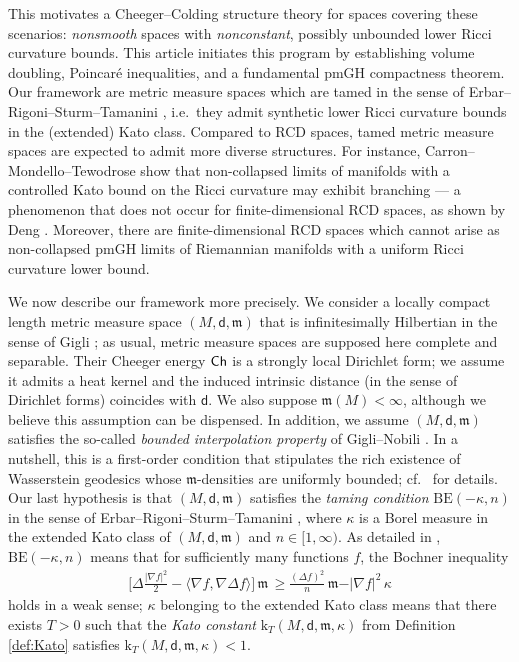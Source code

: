 \documentclass[10pt]{article}
\newcommand{\m}{\mathfrak{m}}
\newcommand{\M}{{\mathit{M}}}
\renewcommand{\k}{\mathrm{k}}
\newcommand{\dist}{\mathsf{d}}
\newcommand{\Ch}{{\sf Ch}}
\newcommand{\BE}{{\mathrm{BE}}}
\theoremstyle{plain}
\theoremstyle{definition}
\begin{document}
This motivates a Cheeger--Colding structure theory for spaces covering these scenarios: \emph{non\-smooth} spaces with \emph{nonconstant}, possibly unbounded lower Ricci curvature bounds. This article initiates this program by establishing volume doubling, Poincaré inequalities, and a fundamental pmGH compactness theorem. Our framework are metric measure spaces which are tamed in the sense of Erbar--Rigoni--Sturm--Tamanini \cite{ERST}, i.e.~they admit synthetic lower Ricci curvature bounds in the (extended) Kato class. Compared to RCD spaces, tamed metric measure spaces are expected to admit more diverse structures. For instance, Carron--Mondello--Tewodrose \cite{CMT_branching} show that non-collapsed limits of manifolds with a controlled Kato bound on the Ricci curvature may exhibit branching --- a phenomenon that does not occur for finite-dimensional RCD spaces, as shown by Deng \cite{deng}. Moreover, there are finite-dimensional RCD spaces which cannot arise as non-collapsed pmGH limits of Riemannian manifolds with a uniform Ricci curvature lower bound.

We now describe our framework more precisely. We consider a locally compact length metric measure space $(\M,\dist,\m)$ that is infinitesimally Hilbertian in the sense of Gigli \cite{Gigli15}; as usual, metric measure spaces are supposed here complete and separable. Their Cheeger energy $\Ch$ is a strongly local Dirichlet form; we assume it admits a heat kernel and the induced intrinsic distance (in the sense of Dirichlet forms) coincides with $\dist$. We also suppose $\m(M) < \infty$, although we believe this assumption can be dispensed. In addition, we assume $(\M,\dist,\m)$ satisfies the so-called \emph{bounded interpolation property} of Gigli--Nobili \cite{GigliNobili}. In a nutshell, this is a first-order condition that stipulates the rich existence of Wasserstein geodesics whose $\m$-densities are uniformly bounded; cf.~ for details. Our last hypothesis is that $(M,\dist,\m)$ satisfies the  \emph{taming condition} $\BE(-\kappa,n)$ in the sense of Erbar--Rigoni--Sturm--Tamanini \cite{ERST}, where $\kappa$ is a Borel measure in the extended Kato class of $(\M,\dist,\m)$ and $n\in [1,\infty)$. As detailed in , $\BE(-\kappa,n)$ means that for sufficiently many functions $f$, the Bochner inequality 
\begin{align*}
    \Big[\Delta\frac{\vert \nabla f\vert^2}{2} - \langle\nabla f,\nabla\Delta f\rangle\Big]\,\m\, \geq \frac{(\Delta f)^2}{n}\,\m - \vert\nabla f\vert^2\,\kappa
\end{align*}
holds in a weak sense; $\kappa$ belonging to the extended Kato class means that there exists $T>0$ such that the \emph{Kato constant} $\k_T(\M,\dist,\m,\kappa)$ from Definition \ref{def:Kato} satisfies $\k_T(\M,\dist,\m,\kappa)<1$.
\end{document}
